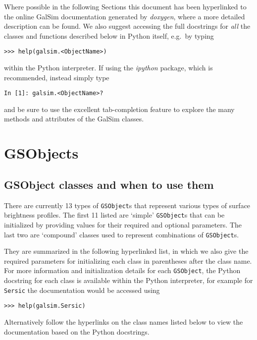 \documentclass[preprint,11pt]{../../devel/modules/aastex}
\begin{document}
Where possible in the following Sections this document has been hyperlinked to the online
GalSim documentation generated by \emph{doxygen}, where a more detailed
description can be found.  We also suggest accessing the full docstrings for \emph{all} the
classes and functions described below in Python itself, e.g.\ by typing

{\tt >>> help(galsim.<ObjectName>)}

within the Python interpreter.  If using the \emph{ipython} package,
which is recommended, instead simply type

{\tt In [1]: galsim.<ObjectName>?}

and be sure to use the excellent tab-completion feature to explore the many
methods and attributes of the GalSim classes.

\newpage

\section{GSObjects}\label{sect:gsobjects}

\subsection{GSObject classes and when to use them}\label{sect:gsobjectclasses}
There are currently 13 types of \texttt{GSObject}s that represent
various types of surface brightness profiles. The first 11 listed are
`simple' \texttt{GSObject}s that can be initialized by providing
values for their required and optional parameters.  The last two are
`compound' classes used to represent combinations of
\texttt{GSObject}s.

They are summarized in the following hyperlinked list, in which we also give
the required parameters for initializing each class in parentheses
after the class name.  For more information and initialization details for each \texttt{GSObject},
the Python docstring for each class is available within the Python interpreter, for example for
\texttt{Sersic} the documentation would be accessed using 

{\tt >>> help(galsim.Sersic)}

Alternatively follow the hyperlinks on
the class names listed below to view the documentation based
on the Python docstrings.
\end{document}
